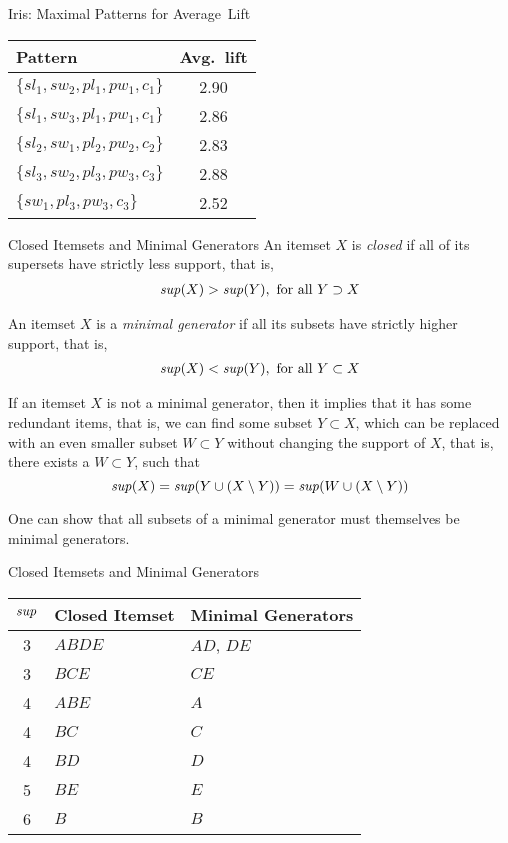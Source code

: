 \begin{frame}{Iris: Maximal Patterns for Average~Lift}
\begin{center}
\begin{tabular}{|l|c|}
\hline
Pattern & Avg.\ lift\\ \hline
$\{sl_1, sw_2, pl_1, pw_1, c_1\}$ & 2.90 \\ \hline
$\{sl_1, sw_3, pl_1, pw_1, c_1\}$ & 2.86 \\ \hline
$\{sl_2, sw_1, pl_2, pw_2, c_2\}$ & 2.83 \\ \hline
$\{sl_3, sw_2, pl_3, pw_3, c_3\}$ & 2.88 \\ \hline
$\{sw_1, pl_3, pw_3, c_3\}$ & 2.52 \\ \hline
\end{tabular}%
\end{center}
\end{frame}


\begin{frame}{Closed Itemsets and Minimal Generators}
An itemset $X$ is {\em closed}
if all of its supersets have strictly
less support, that is,
\begin{align*}
  \mathit{sup}(X) > \mathit{sup}(Y), \text{ for all } Y \supset X
\end{align*}

\medskip
An itemset $X$ is a {\em minimal generator}
if all its subsets
have strictly
higher support, that is,
\begin{align*}
  \mathit{sup}(X) < \mathit{sup}(Y), \text{ for all } Y \subset X
\end{align*}

\medskip
If an itemset $X$ is not a minimal generator, then
it implies that it has some redundant items, that is,
we can f\/{i}nd some subset $Y \subset X$, which can be replaced
with an
even smaller subset $W \subset Y$ without
changing the support of $X$, that is, there exists a $W \subset Y$, such
that
$$\mathit{sup}(X) =
\mathit{sup}(Y \cup (X\setminus Y)) =
\mathit{sup}(W \cup (X \setminus Y))$$

\medskip
One can show that all subsets of a minimal generator must themselves be
minimal generators.
\end{frame}

\begin{frame}{Closed Itemsets and Minimal Generators}
\begin{center}
\begin{tabular}{|c|l|l|}
\hline
$\mathit{sup}$ & Closed Itemset & Minimal Generators \\ \hline
3 & $\mathit{ABDE}$ & $\mathit{AD}$, $\mathit{DE}$\\
3 & $\mathit{BCE}$ & $\mathit{CE}$\\
4 & $\mathit{ABE}$ & $A$\\
4 & $\mathit{BC}$ & $C$\\
4 & $\mathit{BD}$ & $D$\\
5 & $\mathit{BE}$ & $E$\\
6 & $B$ & $B$\\ \hline
\end{tabular}%
\end{center}
\end{frame}


